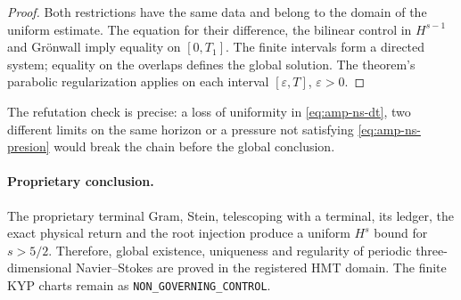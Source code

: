 \begin{proof}
Both restrictions have the same data and belong to the domain of the
uniform estimate. The equation for their difference, the bilinear control in
\(H^{s-1}\) and Grönwall imply equality on \([0,T_1]\). The finite
intervals form a directed system; equality on the overlaps defines
the global solution. The theorem's parabolic regularization applies on
each interval \([\varepsilon,T]\), \(\varepsilon>0\).
\end{proof}

The refutation check is precise: a loss of uniformity in
\eqref{eq:amp-ns-dt}, two different limits on the same horizon or a
pressure not satisfying \eqref{eq:amp-ns-presion} would break the chain before
the global conclusion.

\paragraph{Proprietary conclusion.}
The proprietary terminal Gram, Stein, telescoping with a terminal, its ledger,
the exact physical return and the root injection produce a uniform \(H^s\) bound for
\(s>5/2\). Therefore, global existence, uniqueness and regularity
of periodic three-dimensional Navier--Stokes are proved in the registered HMT
domain. The finite KYP charts remain as
\texttt{NON\_GOVERNING\_CONTROL}.
